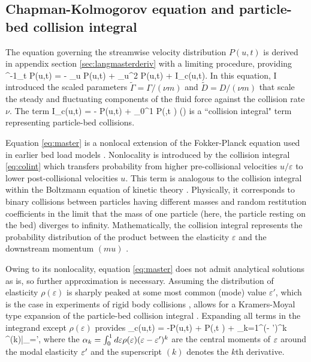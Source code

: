 \subsection{Chapman-Kolmogorov equation and particle-bed collision integral}

The equation governing the streamwise velocity distribution $P(u,t)$ is derived in appendix section \ref{sec:langmasterderiv} with a limiting procedure, providing
\be \nu^{-1}\partial_t P(u,t) = - \tilde{\Gamma} \partial_u P(u,t) +  \partial_u^2 P(u,t) + I_c(u,t). \label{eq:master} \ee
In this equation, I introduced the scaled parameters $\tilde{\Gamma} = \Gamma/(\nu m)$ and $\tilde{D} = D/(\nu m)$ that scale the steady and fluctuating components of the fluid force against the collision rate $\nu$. The term
\be I_c(u,t) = - P(u,t) + \int_0^1 P\big(,t \big) \rho(\ve) \label{eq:colint} \ee
is a ``collision integral" term representing particle-bed collisions.

Equation \ref{eq:master} is a nonlocal extension of the Fokker-Planck equation used in earlier bed load models \citep{Fan2014,Ancey2014}. 
Nonlocality is introduced by the collision integral \ref{eq:colint} which transfers probability from higher pre-collisional velocities $u/\varepsilon$ to lower post-collisional velocities $u$.
This term is analogous to the collision integral within the Boltzmann equation of kinetic theory \citep{Duderstadt1979, Brilliantov2004}. Physically, it corresponds to binary collisions between particles having different masses and random restitution coefficients \cite{Serero2015} in the limit that the mass of one particle (here, the particle resting on the bed) diverges to infinity.
Mathematically, the collision integral represents the probability distribution of the product between the elasticity $\varepsilon$ and the downstream momentum $(m u)$ \citep[cf.][]{Feller1968}.


Owing to its nonlocality, equation \ref{eq:master} does not admit analytical solutions as is, so further approximation is necessary.
Assuming the distribution of elasticity $\rho(\varepsilon)$ is sharply peaked at some most common (mode) value $\varepsilon'$, which is the case in experiments of rigid body collisions \citep{Glielmo2014}, allows for a Kramers-Moyal type expansion of the particle-bed collision integral \citep{Gardiner1983}.
Expanding all terms in the integrand except $\rho(\varepsilon)$ provides
\be {}_c(u,t) = -P(u,t) + P\big(,t \big) + \sum_{k=1}^\infty {}(\ve - \ve')^k ^{(k)}\Big|_{\ve=\ve'},\label{eq:expansion}\ee
where the $\alpha_k = \int_0^1 d\varepsilon \rho(\varepsilon) (\varepsilon-\varepsilon')^k $ are the central moments of $\varepsilon$ around the modal elasticity $\varepsilon'$ and the superscript $(k)$ denotes the $k$th derivative.


